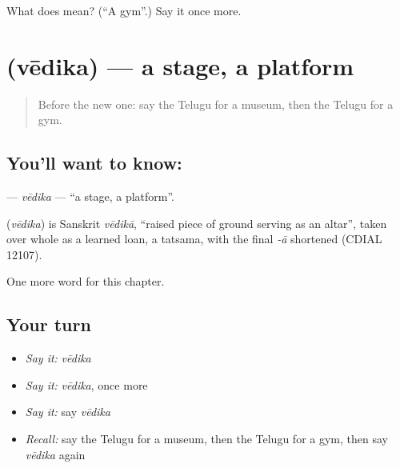 \begin{tcolorbox}[breakable,colback=teal!4,colframe=teal!35!black,title={Before you move on}]
What does  mean? (\textquotedblleft{}A gym\textquotedblright{}.) Say it once more.
\end{tcolorbox}
\section[\texorpdfstring{\te{వేదిక} (vēdika)}{వేదిక (vēdika)}]{ (vēdika) — a stage, a platform}

\label{lesson:TE-C255-vedika}



\begin{quote}
Before the new one: say the Telugu for a museum, then the Telugu for a gym.
\end{quote}

\subsection*{You'll want to know: }
\textbf{} — \emph{vēdika} — \textquotedblleft{}a stage, a platform\textquotedblright{}.

\begin{cousinweb}
\textbf{} (\emph{vēdika}) is Sanskrit \emph{vēdikā}, \textquotedblleft{}raised piece of ground serving as an altar\textquotedblright{}, taken over whole as a learned loan, a tatsama, with the final \emph{-ā} shortened (CDIAL 12107).
\end{cousinweb}

\begin{grammarlens}[title={What you've built}]
One more word for this chapter.
\end{grammarlens}

\subsection*{Your turn}
\begin{itemize}
\raggedright
  \item \emph{Say it:} \emph{vēdika}
  \item \emph{Say it:} \emph{vēdika}, once more
  \item \emph{Say it:} say \emph{vēdika}
  \item \emph{Recall:} say the Telugu for a museum, then the Telugu for a gym, then say \emph{vēdika} again
\end{itemize}


